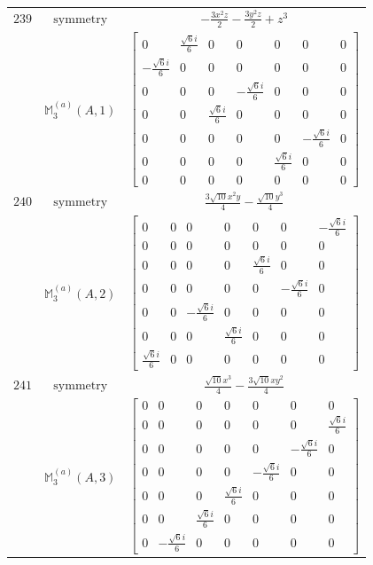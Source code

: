 \documentclass[fleqn,8pt,landscape]{jsarticle}
\begin{document}
\begin{longtable}{ccc}
$ 239 $ & $ \text{symmetry} $ & $ - \frac{3 x^{2} z}{2} - \frac{3 y^{2} z}{2} + z^{3} $ \\
$  $ & $ \mathbb{M}_{3}^{(a)}(A,1) $ & $ \begin{bmatrix} 0 & \frac{\sqrt{6} i}{6} & 0 & 0 & 0 & 0 & 0 \\ - \frac{\sqrt{6} i}{6} & 0 & 0 & 0 & 0 & 0 & 0 \\ 0 & 0 & 0 & - \frac{\sqrt{6} i}{6} & 0 & 0 & 0 \\ 0 & 0 & \frac{\sqrt{6} i}{6} & 0 & 0 & 0 & 0 \\ 0 & 0 & 0 & 0 & 0 & - \frac{\sqrt{6} i}{6} & 0 \\ 0 & 0 & 0 & 0 & \frac{\sqrt{6} i}{6} & 0 & 0 \\ 0 & 0 & 0 & 0 & 0 & 0 & 0 \end{bmatrix} $ \\ \hline
$ 240 $ & $ \text{symmetry} $ & $ \frac{3 \sqrt{10} x^{2} y}{4} - \frac{\sqrt{10} y^{3}}{4} $ \\
$  $ & $ \mathbb{M}_{3}^{(a)}(A,2) $ & $ \begin{bmatrix} 0 & 0 & 0 & 0 & 0 & 0 & - \frac{\sqrt{6} i}{6} \\ 0 & 0 & 0 & 0 & 0 & 0 & 0 \\ 0 & 0 & 0 & 0 & \frac{\sqrt{6} i}{6} & 0 & 0 \\ 0 & 0 & 0 & 0 & 0 & - \frac{\sqrt{6} i}{6} & 0 \\ 0 & 0 & - \frac{\sqrt{6} i}{6} & 0 & 0 & 0 & 0 \\ 0 & 0 & 0 & \frac{\sqrt{6} i}{6} & 0 & 0 & 0 \\ \frac{\sqrt{6} i}{6} & 0 & 0 & 0 & 0 & 0 & 0 \end{bmatrix} $ \\ \hline
$ 241 $ & $ \text{symmetry} $ & $ \frac{\sqrt{10} x^{3}}{4} - \frac{3 \sqrt{10} x y^{2}}{4} $ \\
$  $ & $ \mathbb{M}_{3}^{(a)}(A,3) $ & $ \begin{bmatrix} 0 & 0 & 0 & 0 & 0 & 0 & 0 \\ 0 & 0 & 0 & 0 & 0 & 0 & \frac{\sqrt{6} i}{6} \\ 0 & 0 & 0 & 0 & 0 & - \frac{\sqrt{6} i}{6} & 0 \\ 0 & 0 & 0 & 0 & - \frac{\sqrt{6} i}{6} & 0 & 0 \\ 0 & 0 & 0 & \frac{\sqrt{6} i}{6} & 0 & 0 & 0 \\ 0 & 0 & \frac{\sqrt{6} i}{6} & 0 & 0 & 0 & 0 \\ 0 & - \frac{\sqrt{6} i}{6} & 0 & 0 & 0 & 0 & 0 \end{bmatrix} $ \\ \hline

\end{longtable}
\end{document}
